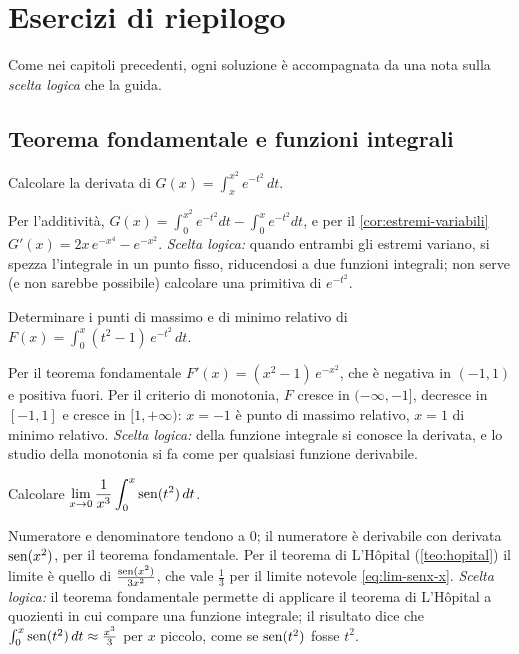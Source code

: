 \section{Esercizi di riepilogo}
\label{sec:esercizi-cap9}

Come nei capitoli precedenti, ogni soluzione è accompagnata da una nota sulla
\emph{scelta logica} che la guida.

\subsection*{Teorema fondamentale e funzioni integrali}

\begin{esercizio}
Calcolare la derivata di $G(x)=\int_{x}^{x^{2}}e^{-t^{2}}\,dt$.
\begin{soluzione}
Per l'additività, $G(x)=\int_{0}^{x^{2}}e^{-t^{2}}dt-\int_{0}^{x}e^{-t^{2}}dt$, e per il
\cref{cor:estremi-variabili} $G'(x)=2x\,e^{-x^{4}}-e^{-x^{2}}$. \emph{Scelta logica:} quando
entrambi gli estremi variano, si spezza l'integrale in un punto fisso, riducendosi a due
funzioni integrali; non serve (e non sarebbe possibile) calcolare una primitiva di
$e^{-t^{2}}$.
\end{soluzione}
\end{esercizio}

\begin{esercizio}
Determinare i punti di massimo e di minimo relativo di
$F(x)=\int_{0}^{x}(t^{2}-1)\,e^{-t^{2}}\,dt$.
\begin{soluzione}
Per il teorema fondamentale $F'(x)=(x^{2}-1)\,e^{-x^{2}}$, che è negativa in $(-1,1)$ e positiva
fuori. Per il criterio di monotonia, $F$ cresce in $(-\infty,-1]$, decresce in $[-1,1]$ e cresce
in $[1,+\infty)$: $x=-1$ è punto di massimo relativo, $x=1$ di minimo relativo.
\emph{Scelta logica:} della funzione integrale si conosce la derivata, e lo studio della
monotonia si fa come per qualsiasi funzione derivabile.
\end{soluzione}
\end{esercizio}

\begin{esercizio}
Calcolare $\displaystyle\lim_{x\to0}\frac1{x^{3}}\int_{0}^{x}\operatorname{sen}(t^{2})\,dt$.
\begin{soluzione}
Numeratore e denominatore tendono a $0$; il numeratore è derivabile con derivata
$\operatorname{sen}(x^{2})$, per il teorema fondamentale. Per il teorema di L'Hôpital
(\cref{teo:hopital}) il limite è quello di $\frac{\operatorname{sen}(x^{2})}{3x^{2}}$, che vale $\frac13$ per il limite
notevole \eqref{eq:lim-senx-x}. \emph{Scelta logica:} il teorema fondamentale permette di
applicare il teorema di L'Hôpital a quozienti in cui compare una funzione integrale; il risultato
dice che $\int_{0}^{x}\operatorname{sen}(t^{2})\,dt\approx\frac{x^{3}}3$ per $x$ piccolo, come se $\operatorname{sen}(t^{2})$ fosse $t^{2}$.
\end{soluzione}
\end{esercizio}

